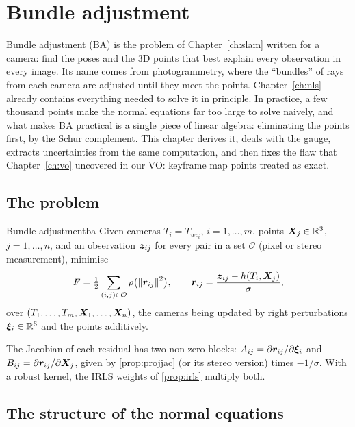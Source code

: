 \chapter{Bundle adjustment}
\label{ch:ba}

Bundle adjustment (BA) is the problem of Chapter~\ref{ch:slam} written
for a camera: find the poses and the 3D points that best explain every
observation in every image. Its name comes from photogrammetry, where
the ``bundles'' of rays from each camera are adjusted until they meet
the points. Chapter~\ref{ch:nls} already contains everything needed to
solve it in principle. In practice, a few thousand points make the
normal equations far too large to solve naively, and what makes BA
practical is a single piece of linear algebra: eliminating the points
first, by the Schur complement. This chapter derives it, deals with the
gauge, extracts uncertainties from the same computation, and then fixes
the flaw that Chapter~\ref{ch:vo} uncovered in our VO: keyframe map
points treated as exact.

\section{The problem}

\begin{definition}{Bundle adjustment}{ba}
Given cameras $T_i=T_{wc_i}$, $i=1,\dots,m$, points $\bm{X}_j\in\mathbb{R}^3$,
$j=1,\dots,n$, and an observation $\bm{z}_{ij}$ for every pair in a set
$\mathcal{O}$ (pixel or stereo measurement), minimise
\[
F=\tfrac12\sum_{(i,j)\in\mathcal{O}}\rho\bigl(\left\lVert \bm{r}_{ij}\right\rVert^2
\bigr),\qquad \bm{r}_{ij}=\frac{\bm{z}_{ij}-h(T_i,\bm{X}_j)}{\sigma},
\]
over $(T_1,\dots,T_m,\bm{X}_1,\dots,\bm{X}_n)$, the cameras being
updated by right perturbations $\bm{\xi}_i\in\mathbb{R}^6$ and the points additively.
\end{definition}

The Jacobian of each residual has two non-zero blocks:
$A_{ij}=\partial\bm{r}_{ij}/\partial\bm{\xi}_i$ and
$B_{ij}=\partial\bm{r}_{ij}/\partial\bm{X}_j$, given by
\cref{prop:projjac} (or its stereo version) times $-1/\sigma$. With a
robust kernel, the IRLS weights of \cref{prop:irls} multiply both.

\section{The structure of the normal equations}

